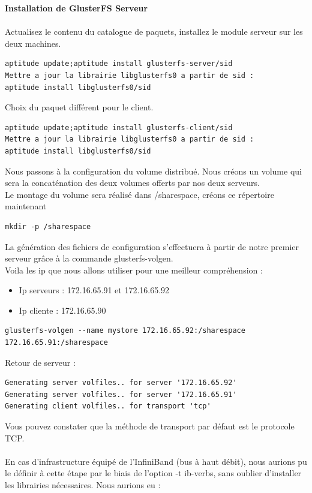 \documentclass[12pt]{report}
\begin{document}
\textbf{Installation de GlusterFS Serveur}\\\\
Actualisez le contenu du catalogue de paquets, installez le module serveur sur les deux machines.
\begin{lstlisting}
aptitude update;aptitude install glusterfs-server/sid
Mettre a jour la librairie libglusterfs0 a partir de sid : 
aptitude install libglusterfs0/sid
	  \end{lstlisting}
Choix du paquet différent pour le client.
\begin{lstlisting}
aptitude update;aptitude install glusterfs-client/sid
Mettre a jour la librairie libglusterfs0 a partir de sid : 
aptitude install libglusterfs0/sid
	  \end{lstlisting}
Nous passons à la configuration du volume distribué. Nous créons un volume qui sera la concaténation des deux volumes offerts par nos deux serveurs.\\
Le montage du volume sera réalisé dans /sharespace, créons ce répertoire maintenant\\
\begin{lstlisting}
mkdir -p /sharespace
	  \end{lstlisting}
La génération des fichiers de configuration s'effectuera à partir de notre premier serveur grâce à la commande glusterfs-volgen.\\
Voila les ip que nous allons utiliser pour une meilleur compréhension :
	\begin{itemize}
		\item Ip serveurs : 172.16.65.91 et 172.16.65.92
		\item Ip cliente :  172.16.65.90\\
	\end{itemize}
\begin{lstlisting}
glusterfs-volgen --name mystore 172.16.65.92:/sharespace 172.16.65.91:/sharespace
\end{lstlisting}
Retour de serveur :
\begin{lstlisting}
Generating server volfiles.. for server '172.16.65.92'
Generating server volfiles.. for server '172.16.65.91'
Generating client volfiles.. for transport 'tcp'
	  \end{lstlisting}
Vous pouvez constater que la méthode de transport par défaut est le protocole TCP.\\\\
En cas d'infrastructure équipé de l'InfiniBand (bus à haut débit), nous aurions pu le définir à cette étape par le biais de l'option -t ib-verbs, sans oublier d'installer les librairies nécessaires. Nous aurions eu :\\
\end{document}
